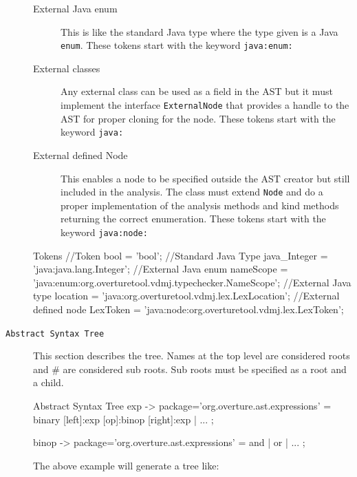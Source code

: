 \begin{description}
\begin{description}
\item [External Java enum] This is like the standard Java type where the type given is a Java \texttt{enum}.  These tokens start with the keyword \texttt{java:enum:}

\item [External classes] Any external class can be used as a field in the AST but it must implement the interface \texttt{ExternalNode} that provides a handle to the AST for proper cloning for the node.  These tokens start with the keyword \texttt{java:}

\item [External defined Node] This enables a node to be specified outside the AST creator but still included in the analysis. The class must extend \texttt{Node} and do a proper implementation of the analysis methods and kind methods returning the correct enumeration.  These tokens start with the keyword \texttt{java:node:}

\end{description}

\begin{astlst}
Tokens
//Token 
bool = 'bool'; 
//Standard Java Type
java_Integer = 'java:java.lang.Integer'; 
//External Java enum
nameScope = 'java:enum:org.overturetool.vdmj.typechecker.NameScope';
//External Java type
location = 'java:org.overturetool.vdmj.lex.LexLocation'; 
//External defined node
LexToken = 'java:node:org.overturetool.vdmj.lex.LexToken'; 
\end{astlst}

\item[\texttt{Abstract Syntax Tree}] This section describes the tree. Names at the top level are considered roots and \# are considered sub roots. Sub roots must be  specified as a root and a child. 

\begin{astlst}
Abstract Syntax Tree
exp {-> package='org.overture.ast.expressions'}
    =   {binary} [left]:exp [op]:binop [right]:exp
    |   ...
    ;

binop {-> package='org.overture.ast.expressions'}
    = {and}
    |   {or}
    |   ...
    ;
\end{astlst}



The above example will generate a tree like:
\begin{figure}[htb]
\begin{minipage}{0.5\linewidth}


\end{minipage}
\end{figure}
\end{description}
